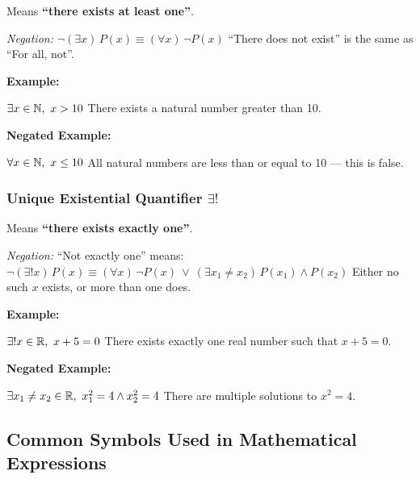 Means \textbf{``there exists at least one''}.
 \vspace{\baselineskip}
			
\emph{Negation:}  \(\neg (\exists x)\,P(x) \equiv (\forall x)\, \neg P(x)\) ``There does not exist'' is 
the same as ``For all, not''.
\vspace{\baselineskip}

\textbf{Example:} 
\vspace{\baselineskip}

\(\exists x \in \mathbb{N},\ x > 10\) There exists a natural number greater than 10.
\vspace{\baselineskip}
			
\textbf{Negated Example:}  
\vspace{\baselineskip}

\(\forall x \in \mathbb{N},\ x \leq 10\) All natural numbers are less than or equal to 10 — this is false.

\subsubsection{Unique Existential Quantifier \texorpdfstring{\(\exists ! \)}{}} 
	
Means \textbf{``there exists exactly one''}.
\vspace{\baselineskip}
		
\emph{Negation:} ``Not exactly one'' means:
\(\neg (\exists! x)\, P(x) \equiv (\forall x)\, \neg P(x)\ \lor\ (\exists x_1 \neq x_2)\, P(x_1) \land 
P(x_2)\) Either no such \(x\) exists, or more than one does.
\vspace{\baselineskip}

\textbf{Example:} 
\vspace{\baselineskip}

\(\exists! x \in \mathbb{R},\ x + 5 = 0\) There exists exactly one real number such that \( x + 5 = 0 \).
\vspace{\baselineskip}

\textbf{Negated Example:}  
\vspace{\baselineskip}

\(\exists x_1 \neq x_2 \in \mathbb{R},\ x_1^2 = 4 \land x_2^2 = 4\) There are multiple solutions to 
\( x^2 = 4 \).

\subsection{Common Symbols Used in Mathematical Expressions}

